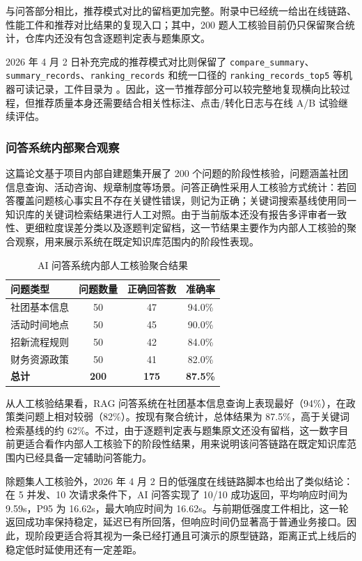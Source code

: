 与问答部分相比，推荐模式对比的留档更加完整。附录中已经统一给出在线链路、性能工件和推荐对比结果的复现入口；其中，200 题人工核验目前仍只保留聚合统计，仓库内还没有包含逐题判定表与题集原文。

2026 年 4 月 2 日补充完成的推荐模式对比则保留了 \texttt{compare\_summary}、\texttt{summary\_records}、\texttt{ranking\_records} 和统一口径的 \texttt{ranking\_records\_top5} 等机器可读记录，工件目录为 。因此，这一节推荐部分可以较完整地复现横向比较过程，但推荐质量本身还需要结合相关性标注、点击/转化日志与在线 A/B 试验继续评估。

\subsubsection{问答系统内部聚合观察}

这篇论文基于项目内部自建题集开展了 200 个问题的阶段性核验，问题涵盖社团信息查询、活动咨询、规章制度等场景。问答正确性采用人工核验方式统计：若回答覆盖问题核心事实且不存在关键性错误，则记为正确；关键词搜索基线使用同一知识库的关键词检索结果进行人工对照。由于当前版本还没有报告多评审者一致性、更细粒度误差分类以及逐题判定留档，这一节结果主要作为内部人工核验的聚合观察，用来展示系统在既定知识库范围内的阶段性表现。

\begin{table}[H]
\centering
\caption{AI 问答系统内部人工核验聚合结果}
\label{tab:ai-qa-accuracy}
\begin{tabular}{lccc}
\toprule
问题类型 & 问题数量 & 正确回答数 & 准确率 \\
\midrule
社团基本信息 & 50 & 47 & 94.0\% \\
活动时间地点 & 50 & 45 & 90.0\% \\
招新流程规则 & 50 & 42 & 84.0\% \\
财务资源政策 & 50 & 41 & 82.0\% \\
\midrule
\textbf{总计} & \textbf{200} & \textbf{175} & \textbf{87.5\%} \\
\bottomrule
\end{tabular}
\end{table}

从人工核验结果看，RAG 问答系统在社团基本信息查询上表现最好（94\%），在政策类问题上相对较弱（82\%）。按现有聚合统计，总体结果为 87.5\%，高于关键词检索基线的约 62\%。不过，由于逐题判定表与题集原文还没有留档，这一数字目前更适合看作内部人工核验下的阶段性结果，用来说明该问答链路在既定知识库范围内已经具备一定辅助问答能力。

除题集人工核验外，2026 年 4 月 2 日的低强度在线链路脚本也给出了类似结论：在 5 并发、10 次请求条件下，AI 问答实现了 10/10 成功返回，平均响应时间为 9.59s，P95 为 16.62s，最大响应时间为 16.62s。与前期低强度工件相比，这一轮返回成功率保持稳定，延迟已有所回落，但响应时间仍显著高于普通业务接口。因此，现阶段更适合将其视为一条已经打通且可演示的原型链路，距离正式上线后的稳定低时延使用还有一定差距。

